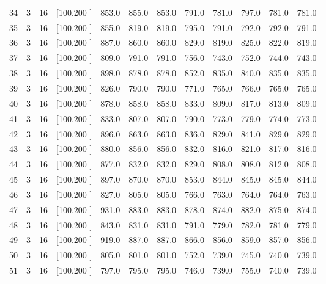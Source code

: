\documentclass[12pt,a4paper]{article}
\begin{document}
\begin{center}
{\begin{tabular}{r r r r r r r r r r r r}
  34&  3& 16&[100.200   ]&   853.0&   855.0&   853.0&   791.0&   781.0&   797.0&   781.0&   781.0\\[-0.02in]
  35&  3& 16&[100.200   ]&   855.0&   819.0&   819.0&   795.0&   791.0&   792.0&   792.0&   791.0\\[-0.02in]
  36&  3& 16&[100.200   ]&   887.0&   860.0&   860.0&   829.0&   819.0&   825.0&   822.0&   819.0\\[-0.02in]
  37&  3& 16&[100.200   ]&   809.0&   791.0&   791.0&   756.0&   743.0&   752.0&   744.0&   743.0\\[-0.02in]
  38&  3& 16&[100.200   ]&   898.0&   878.0&   878.0&   852.0&   835.0&   840.0&   835.0&   835.0\\[-0.02in]
  39&  3& 16&[100.200   ]&   826.0&   790.0&   790.0&   771.0&   765.0&   766.0&   765.0&   765.0\\[-0.02in]
  40&  3& 16&[100.200   ]&   878.0&   858.0&   858.0&   833.0&   809.0&   817.0&   813.0&   809.0\\[-0.02in]
  41&  3& 16&[100.200   ]&   833.0&   807.0&   807.0&   790.0&   773.0&   779.0&   774.0&   773.0\\[-0.02in]
  42&  3& 16&[100.200   ]&   896.0&   863.0&   863.0&   836.0&   829.0&   841.0&   829.0&   829.0\\[-0.02in]
  43&  3& 16&[100.200   ]&   880.0&   856.0&   856.0&   832.0&   816.0&   821.0&   817.0&   816.0\\[-0.02in]
  44&  3& 16&[100.200   ]&   877.0&   832.0&   832.0&   829.0&   808.0&   808.0&   812.0&   808.0\\[-0.02in]
  45&  3& 16&[100.200   ]&   897.0&   870.0&   870.0&   853.0&   844.0&   845.0&   845.0&   844.0\\[-0.02in]
  46&  3& 16&[100.200   ]&   827.0&   805.0&   805.0&   766.0&   763.0&   764.0&   764.0&   763.0\\[-0.02in]
  47&  3& 16&[100.200   ]&   931.0&   883.0&   883.0&   878.0&   874.0&   882.0&   875.0&   874.0\\[-0.02in]
  48&  3& 16&[100.200   ]&   843.0&   831.0&   831.0&   791.0&   779.0&   782.0&   781.0&   779.0\\[-0.02in]
  49&  3& 16&[100.200   ]&   919.0&   887.0&   887.0&   866.0&   856.0&   859.0&   857.0&   856.0\\[-0.02in]
  50&  3& 16&[100.200   ]&   805.0&   801.0&   801.0&   752.0&   739.0&   745.0&   740.0&   739.0\\[-0.02in]
  51&  3& 16&[100.200   ]&   797.0&   795.0&   795.0&   746.0&   739.0&   755.0&   740.0&   739.0\\[-0.02in]

\end{tabular}}
\end{center}
\end{document}
